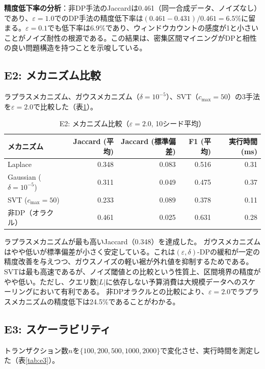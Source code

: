 \textbf{精度低下率の分析}：非DP手法のJaccardは0.461（同一合成データ、ノイズなし）であり、$\varepsilon = 1.0$でのDP手法の精度低下率は$(0.461 - 0.431) / 0.461 = 6.5\%$に留まる。$\varepsilon = 0.1$でも低下率は6.9\%であり、ウィンドウカウントの感度が1と小さいことがノイズ耐性の根源である。この結果は、密集区間マイニングがDPと相性の良い問題構造を持つことを示唆している。

\subsection{E2: メカニズム比較}

ラプラスメカニズム、ガウスメカニズム（$\delta = 10^{-5}$）、SVT（$c_\text{max} = 50$）の3手法を$\varepsilon = 2.0$で比較した（表\ref{tab:e2}）。

\begin{table}[t]
\centering
\caption{E2: メカニズム比較（$\varepsilon = 2.0$, 10シード平均）}
\label{tab:e2}
\begin{tabular}{lrrrr}
\toprule
メカニズム & Jaccard (平均) & Jaccard (標準偏差) & F1 (平均) & 実行時間 (ms) \\
\midrule
Laplace  & 0.348 & 0.083 & 0.516 & 0.31 \\
Gaussian ($\delta\!=\!10^{-5}$) & 0.311 & 0.049 & 0.475 & 0.37 \\
SVT ($c_\text{max}\!=\!50$) & 0.233 & 0.089 & 0.378 & 0.11 \\
非DP（オラクル） & 0.461 & 0.025 & 0.631 & 0.28 \\
\bottomrule
\end{tabular}
\end{table}

ラプラスメカニズムが最も高いJaccard（0.348）を達成した。
ガウスメカニズムはやや低いが標準偏差が小さく安定している。これは$(\varepsilon, \delta)$-DPの緩和が一定の精度改善を与えつつ、ガウスノイズの軽い裾が外れ値を抑制するためである。
SVTは最も高速であるが、ノイズ閾値との比較という性質上、区間境界の精度がやや低い。ただし、クエリ数$|L|$に依存しない予算消費は大規模データへのスケーリングにおいて有利である。
非DPオラクルとの比較により、$\varepsilon = 2.0$でラプラスメカニズムの精度低下は24.5\%であることがわかる。

\subsection{E3: スケーラビリティ}

トランザクション数$n$を$\{100, 200, 500, 1000, 2000\}$で変化させ、実行時間を測定した（表\ref{tab:e3}）。

